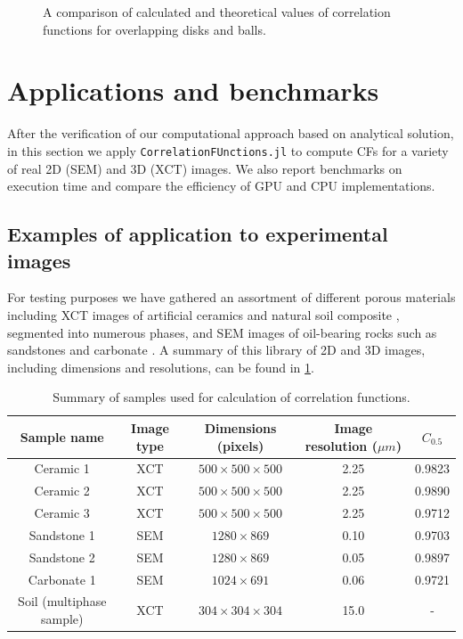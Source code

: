 \documentclass[1p]{elsarticle}
\newcommand{\code}[1]{\colorbox{light-gray}{\texttt{#1}}}
\begin{document}
\begin{figure}[tp]
{    \label{fig:ps}}
  \hfill
  \caption[]{A comparison of calculated and theoretical values of correlation
    functions for overlapping disks and balls.}
  \label{fig:verification}
\end{figure}

\section{Applications and benchmarks}
After the verification of our computational approach based on analytical
solution, in this section we apply \code{CorrelationFUnctions.jl} to compute CFs
for a variety of real 2D (SEM) and 3D (XCT) images. We also report benchmarks on
execution time and compare the efficiency of GPU and CPU implementations.

\subsection{Examples of application to experimental images}
\label{sec:examples}
For testing purposes we have gathered an assortment of different porous
materials including XCT images of artificial ceramics \cite{ceramics} and
natural soil composite \cite{Geoderma2018}, segmented into numerous phases, and
SEM images of oil-bearing rocks such as sandstones and carbonate
\cite{samarin2023robust}.  A summary of this library of 2D and 3D images,
including dimensions and resolutions, can be found in \cref{tab:samples}.

\begin{table}[!pt]
  \centering
  \begin{tabular}{|c|c|c|c|c|}
    \hline
    Sample name & Image type & Dimensions (pixels) & Image resolution ($\mu m$) & $C_{0.5}$\\
    \hline
    Ceramic 1   & XCT & $500 \times 500 \times 500$ & 2.25 & 0.9823 \\
    Ceramic 2   & XCT & $500 \times 500 \times 500$ & 2.25 & 0.9890 \\
    Ceramic 3   & XCT & $500 \times 500 \times 500$ & 2.25 & 0.9712 \\
    Sandstone 1 & SEM &  $1280 \times 869$ & 0.10 & 0.9703 \\
    Sandstone 2 & SEM &  $1280 \times 869$ & 0.05 & 0.9897 \\
    Carbonate 1 & SEM &  $1024 \times 691$ & 0.06 & 0.9721 \\
    \hline
    Soil (multiphase sample) & XCT & $304 \times 304 \times 304$ &
    15.0 & - \\
    \hline
  \end{tabular}
  \caption{Summary of samples used for calculation of correlation functions.}
  \label{tab:samples}
\end{table}
\end{document}
